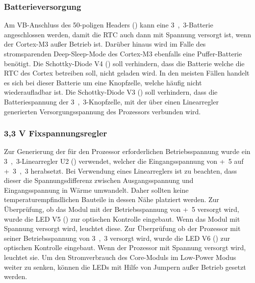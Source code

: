 
\subsubsection{Batterieversorgung}
Am VB-Anschluss des 50-poligen Headers () kann eine \unit{3,3}{\volt}-Batterie angeschlossen werden, damit die \gls{RTC} auch dann mit Spannung versorgt ist, wenn der Cortex-M3 außer Betrieb ist. Darüber hinaus wird im Falle des stromsparenden Deep-Sleep-Mode des Cortex-M3 ebenfalls eine Puffer-Batterie benötigt. Die Schottky-Diode V4 () soll verhindern, dass die Batterie welche die \gls{RTC} des Cortex betreiben soll, nicht geladen wird. In den meisten Fällen handelt es sich bei dieser Batterie um eine Knopfzelle, welche häufig nicht wiederaufladbar ist. Die Schottky-Diode V3 () soll verhindern, dass die Batteriespannung der \unit{3,3}{\volt}-Knopfzelle, mit der über einen Linearregler generierten Versorgungsspannung des Prozessors verbunden wird.


\subsubsection{3,3 V Fixspannungsregler}
Zur Generierung der für den Prozessor erforderlichen Betriebsspannung wurde ein \unit{3,3}{\volt}-Linearregler U2 () verwendet, welcher die Eingangsspannung von \unit{+5}{\volt} auf \unit{+3,3}{\volt} herabsetzt. Bei Verwendung eines Linearreglers ist zu beachten, dass dieser die Spannungsdifferenz zwischen Ausgangsspannung und Eingangsspannung in Wärme umwandelt. Daher sollten keine temperaturempfindlichen Bauteile in dessen Nähe platziert werden. Zur Überprüfung, ob das Modul mit der Betriebsspannung von \unit{+5}{\volt} versorgt wird, wurde die LED V5 () zur optischen Kontrolle eingebaut. Wenn das Modul mit Spannung versorgt wird, leuchtet diese. Zur Überprüfung ob der Prozessor mit seiner Betriebsspannung von \unit{3,3}{\volt} versorgt wird, wurde die LED V6 () zur optischen Kontrolle eingebaut. Wenn der Prozessor mit Spannung versorgt wird, leuchtet sie. Um den Stromverbrauch des \gls{Core-Modul}s im Low-Power Modus weiter zu senken, können die LEDs mit Hilfe von Jumpern außer Betrieb gesetzt werden.

